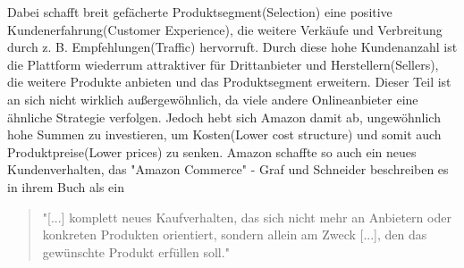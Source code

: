 Dabei schafft breit gefächerte Produktsegment(Selection) eine positive Kundenerfahrung(Customer Experience), die weitere Verkäufe und Verbreitung durch z. B. Empfehlungen(Traffic) hervorruft. Durch diese hohe Kundenanzahl ist die Plattform wiederrum attraktiver für Drittanbieter und Herstellern(Sellers), die weitere Produkte anbieten und das Produktsegment erweitern. Dieser Teil ist an sich nicht wirklich außergewöhnlich, da viele andere Onlineanbieter eine ähnliche Strategie verfolgen. Jedoch hebt sich Amazon damit ab, ungewöhnlich hohe Summen zu investieren, um Kosten(Lower cost structure) und somit auch Produktpreise(Lower prices) zu senken\cite[S. 26f]{Graf}. Amazon schaffte so auch ein neues Kundenverhalten, das "Amazon Commerce" - Graf und Schneider beschreiben es in ihrem Buch als ein

\begin{quote}
    "[...] komplett neues Kaufverhalten, das sich nicht mehr an Anbietern oder konkreten Produkten orientiert, sondern allein am Zweck [...], den das gewünschte Produkt erfüllen soll."\cite[S. 42]{Graf}
\end{quote}

